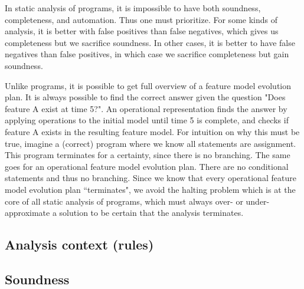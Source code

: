 In static analysis of programs, it is impossible to have both soundness, completeness, and automation. Thus one must prioritize. For some kinds of analysis, it is better with false positives than false negatives, which gives us completeness but we sacrifice soundness. In other cases, it is better to have false negatives than false positives, in which case we sacrifice completeness but gain soundness.

Unlike programs, it is possible to get full overview of a feature model evolution plan. It is always possible to find the correct answer given the question "Does feature A exist at time 5?". An operational representation finds the answer by applying operations to the initial model until time 5 is complete, and checks if feature A exists in the resulting feature model. For intuition on why this must be true, imagine a (correct) program where we know all statements are assignment. This program terminates for a certainty, since there is no branching. The same goes for an operational feature model evolution plan. There are no conditional statements and thus no branching. Since we know that every operational feature model evolution plan ``terminates", we avoid the halting problem which is at the core of all static analysis of programs, which must always over- or under-approximate a solution to be certain that the analysis terminates.

\subsection{Analysis context (rules)}
\label{sub:analysis-context}
\subsection{Soundness}
